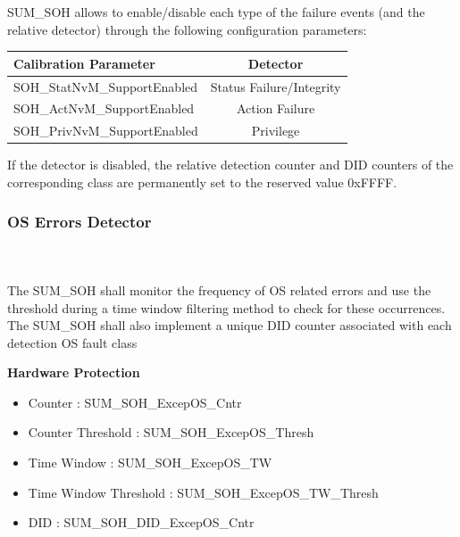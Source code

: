 {
SUM\_SOH allows to enable/disable each type of the failure events (and the relative detector) through the following configuration parameters: \newline


\begin{center}\begin{tabular}{|l|c|}
\hline
\textbf{Calibration Parameter}     & \textbf{Detector}               \\ \hline
SOH\_StatNvM\_SupportEnabled       &  Status Failure/Integrity       \\ \hline
SOH\_ActNvM\_SupportEnabled        &  Action Failure                 \\ \hline
SOH\_PrivNvM\_SupportEnabled       &  Privilege                      \\ \hline
\hline
\end{tabular}\end{center}


If the detector is disabled, the relative detection counter and DID counters of the corresponding class are permanently set to the reserved value 0xFFFF.

}
{
} 
\subsubsection{OS Errors Detector}
\\
\\
The SUM\_SOH shall monitor the frequency of OS related errors and use the threshold during a time window filtering method to
check for these occurrences. The SUM\_SOH shall also implement a unique DID counter associated with each detection OS fault class

\vspace*{0.2in}

\textbf{Hardware Protection}
\begin{itemize}
    \item Counter               : SUM_SOH_ExcepOS_Cntr
    \item Counter Threshold     : SUM_SOH_ExcepOS_Thresh
    \item Time Window           : SUM_SOH_ExcepOS_TW 
    \item Time Window Threshold : SUM_SOH_ExcepOS_TW_Thresh 
    \item DID                   : SUM_SOH_DID_ExcepOS_Cntr
\end{itemize}

